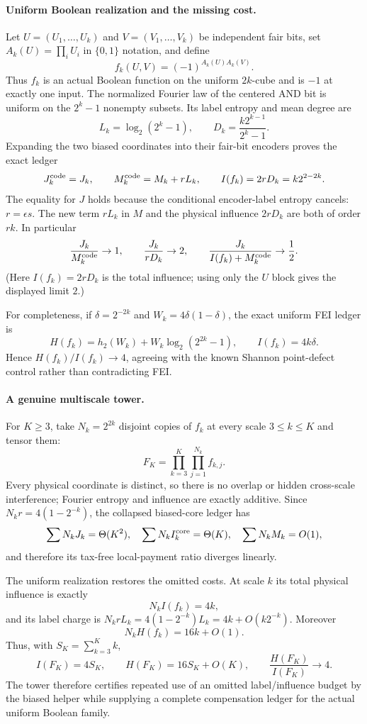 \paragraph{Uniform Boolean realization and the missing cost.}
Let $U=(U_1,\ldots,U_k)$ and $V=(V_1,\ldots,V_k)$ be independent fair
bits, set $A_k(U)=\prod_i U_i$ in $\{0,1\}$ notation, and define
\[
 f_k(U,V)=(-1)^{A_k(U)A_k(V)}.
\]
Thus $f_k$ is an actual Boolean function on the uniform $2k$-cube and is
$-1$ at exactly one input.  The normalized Fourier law of the centered AND
bit is uniform on the $2^k-1$ nonempty subsets.  Its label entropy and mean
degree are
\[
 L_k=\log_2(2^k-1),\qquad
 D_k=\frac{k2^{k-1}}{2^k-1}.
\]
Expanding the two biased coordinates into their fair-bit encoders proves
the exact ledger
\[
 J_k^{\rm code}=J_k,\qquad
 M_k^{\rm code}=M_k+rL_k,\qquad
 I(f_k)=2rD_k=k2^{2-2k}.
\]
The equality for $J$ holds because the conditional encoder-label entropy
cancels: $r=\epsilon s$.  The new term $rL_k$ in $M$ and the physical
influence $2rD_k$ are both of order $rk$.  In particular
\[
 \frac{J_k}{M_k^{\rm code}}\to1,
 \qquad \frac{J_k}{rD_k}\to2,
 \qquad \frac{J_k}{I(f_k)+M_k^{\rm code}}\to\frac12.
\]
(Here $I(f_k)=2rD_k$ is the total influence; using only the $U$ block gives
the displayed limit $2$.)

For completeness, if $\delta=2^{-2k}$ and
$W_k=4\delta(1-\delta)$, the exact uniform FEI ledger is
\[
 H(f_k)=h_2(W_k)+W_k\log_2(2^{2k}-1),\qquad
 I(f_k)=4k\delta.
\]
Hence $H(f_k)/I(f_k)\to4$, agreeing with the known Shannon point-defect
control rather than contradicting FEI.

\paragraph{A genuine multiscale tower.}
For $K\ge3$, take $N_k=2^{2k}$ disjoint copies of $f_k$ at every scale
$3\le k\le K$ and tensor them:
\[
 F_K=\prod_{k=3}^K\prod_{j=1}^{N_k}f_{k,j}.
\]
Every physical coordinate is distinct, so there is no overlap or hidden
cross-scale interference; Fourier entropy and influence are exactly
additive.  Since $N_kr=4(1-2^{-k})$, the collapsed biased-core ledger has
\[
 \sum N_kJ_k=\Theta(K^2),\quad
 \sum N_kI_k^{\rm core}=\Theta(K),\quad
 \sum N_kM_k=O(1),
\]
and therefore its tax-free local-payment ratio diverges linearly.

The uniform realization restores the omitted costs.  At scale $k$ its
total physical influence is exactly
\[
 N_k I(f_k)=4k,
\]
and its label charge is
$N_krL_k=4(1-2^{-k})L_k=4k+O(k2^{-k})$.
Moreover
\[
 N_kH(f_k)=16k+O(1).
\]
Thus, with $S_K=\sum_{k=3}^Kk$,
\[
 I(F_K)=4S_K,\qquad
 H(F_K)=16S_K+O(K),\qquad
 \frac{H(F_K)}{I(F_K)}\to4.
\]
The tower therefore certifies repeated use of an omitted label/influence
budget by the biased helper while supplying a complete compensation ledger
for the actual uniform Boolean family.
